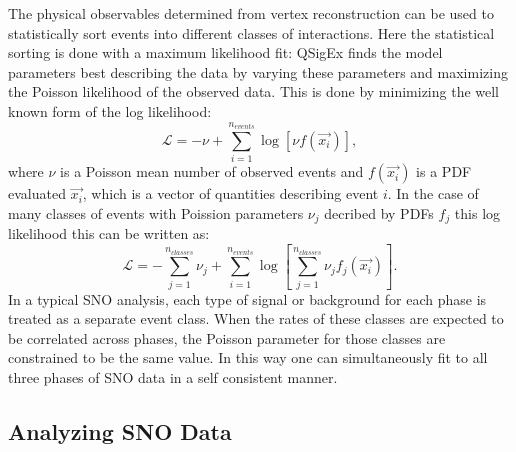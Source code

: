 The physical observables determined from vertex reconstruction can be used to statistically sort events into different classes of interactions.
Here the statistical sorting is done with a maximum likelihood fit: QSigEx finds the model parameters best describing the data by varying these parameters and maximizing the Poisson likelihood of the observed data.
This is done by minimizing the well known form of the log likelihood:
\begin{equation}
    \mathcal{L} = -\nu + \sum_{i=1}^{n_{events}} \log \left[ \nu f(\vec{x_i}) \right],
\end{equation}
where $\nu$ is a Poisson mean number of observed events and $f(\vec{x_i})$ is a PDF evaluated $\vec{x_i}$, which is a vector of quantities describing event $i$.
In the case of many classes of events with Poission parameters $\nu_j$ decribed by PDFs $f_j$ this log likelihood this can be written as:
\begin{equation}
    \mathcal{L} = -\sum_{j=1}^{n_{classes}} \nu_j + \sum_{i=1}^{n_{events}} \log \left[ \sum_{j=1}^{n_{classes}} \nu_j f_j(\vec{x_i}) \right].
\end{equation}
In a typical SNO analysis, each type of signal or background for each phase is treated as a separate event class.
When the rates of these classes are expected to be correlated across phases, the Poisson parameter for those classes are constrained to be the same value.
In this way one can simultaneously fit to all three phases of SNO data in a self consistent manner.

\subsection{Analyzing SNO Data}

